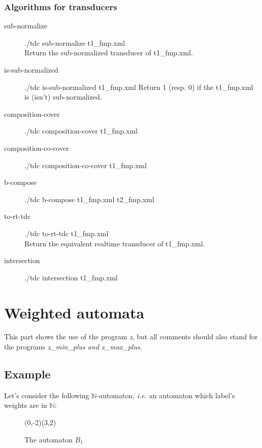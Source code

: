 \subsubsection{Algorithms for transducers}
\begin{description}
\item [sub-normalize]
  ./tdc sub-normalize t1\_fmp.xml\\
  Return the sub-normalized transducer of t1\_fmp.xml.

\item [is-sub-normalized]
  ./tdc is-sub-normalized t1\_fmp.xml
  Return 1 (resp. 0) if the t1\_fmp.xml is (isn't) sub-normalized.

\item [composition-cover]
  ./tdc composition-cover t1\_fmp.xml

\item [composition-co-cover]
  ./tdc composition-co-cover t1\_fmp.xml

\item [b-compose]
  ./tdc b-compose t1\_fmp.xml t2\_fmp.xml

\item [to-rt-tdc]
  ./tdc to-rt-tdc t1\_fmp.xml\\
  Return the equivalent realtime transducer of t1\_fmp.xml.

\item [intersection]
  ./tdc intersection t1\_fmp.xml

\end{description}
\newpage

\section{Weighted automata}

This part shows the use of the program \textit{z}, but all
comments should also stand for the programs \textit{z\_min\_plus and
z\_max\_plus}.

\subsection{Example}

Let's consider the following $\mathbb{N}$-automaton, \textit{i.e.}
an automaton which label's weights are in $\mathbb{N}$:

\begin{figure}[ht] \centering
  \begin{VCPicture}{(0,-2)(3,2)}
     
     
     
     
  \end{VCPicture}
  \caption{The automaton $B_1$}
\end{figure}

